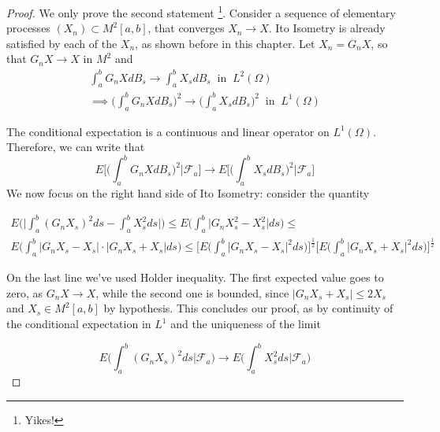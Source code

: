 \begin{proof}
    We only prove the second statement \footnote{Yikes!}. Consider a sequence of elementary processes $(X_n) \subset M^2[a,b]$, that converges $X_n \to X$. Ito Isometry is already satisfied by each of the $X_n$, as shown before in this chapter. Let $X_n = G_n X$, so that $G_n X \to X$ in $M^2$ and
    \begin{gather*}
        \int_a^b G_n X dB_s \to \int_a^b X_s dB_s \;\; \text{in} \;\; L^2(\Omega) \\
        \implies \Bigg( \int_a^b G_n X dB_s \Bigg)^2 \to \Bigg( \int_a^b X_s dB_s \Bigg)^2 \;\; \text{in} \;\; L^1(\Omega) 
    \end{gather*}

    The conditional expectation is a continuous and linear operator on $L^1(\Omega)$. Therefore, we can write that
    \begin{equation*}
        E\Bigg[ \Bigg( \int_a^b G_n X dB_s \Bigg)^2 \Big\vert \mathcal{F}_a \Bigg] \to E\Bigg[ \Bigg( \int_a^b X_s dB_s \Bigg)^2 \Big\vert \mathcal{F}_a \Bigg]
    \end{equation*}
    We now focus on the right hand side of Ito Isometry: consider the quantity

    \begin{gather*}
        E\Bigg( \Bigg\vert \int_a^b (G_n X_s)^2 ds - \int_a^b X_s^2 ds \Bigg\vert \Bigg) \leq E\Bigg( \int_a^b \big\vert G_n X_s^2 - X_s^2 \big\vert  ds \Bigg) \leq \\
        E\Bigg( \int_a^b \big\vert G_n X_s - X_s \big\vert \cdot \big\vert G_n X_s+X_s \big\vert ds \Bigg) \leq \Bigg[ E\Bigg( \int_a^b \vert G_n X_s - X_s\vert^2 ds \Bigg) \Bigg]^{\frac{1}{2}}\Bigg[ E\Bigg( \int_a^b \vert G_n X_s + X_s\vert^2 ds \Bigg) \Bigg]^{\frac{1}{2}}
    \end{gather*}

    On the last line we've used Holder inequality. The first expected value goes to zero, as $G_n X \to X$, while the second one is bounded, since $\vert G_n X_s + X_s \vert \leq 2X_s$ and $X_s \in M^2[a,b]$ by hypothesis. This concludes our proof, as by continuity of the conditional expectation in $L^1$ and the uniqueness of the limit

    \begin{equation*}
        E\Bigg( \int_a^b (G_n X_s)^2 ds \big\vert \mathcal{F}_a \Bigg) \to E\Bigg( \int_a^b X_s^2 ds \big\vert \mathcal{F}_a \Bigg)
    \end{equation*}
\end{proof}

